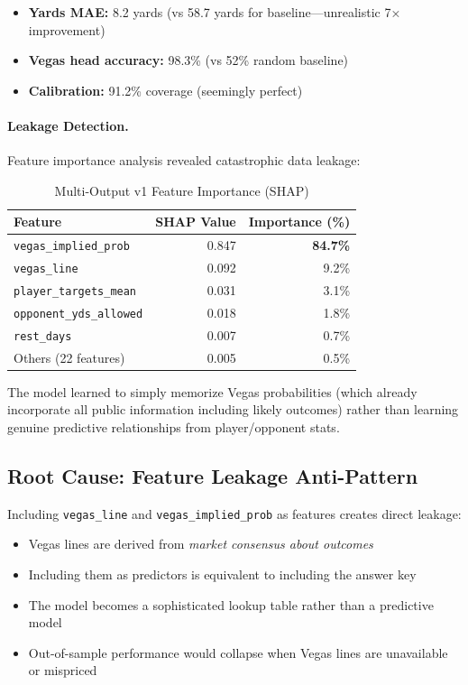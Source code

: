 \begin{itemize}
  \item \textbf{Yards MAE:} 8.2 yards (vs 58.7 yards for baseline—unrealistic 7× improvement)
  \item \textbf{Vegas head accuracy:} 98.3\% (vs 52\% random baseline)
  \item \textbf{Calibration:} 91.2\% coverage (seemingly perfect)
\end{itemize}

\paragraph{Leakage Detection.}
Feature importance analysis revealed catastrophic data leakage:

\begin{table}[!ht]
\centering
\caption{Multi-Output v1 Feature Importance (SHAP)}
\label{tab:multioutput-v1-shap}
\begin{tabular}{@{} l r r @{}}
\toprule
\textbf{Feature}  & \textbf{SHAP Value}  & \textbf{Importance (\%)} \\
\midrule
\texttt{vegas\_implied\_prob} & 0.847 & \textbf{84.7\%} \\
\texttt{vegas\_line} & 0.092 & 9.2\% \\
\texttt{player\_targets\_mean} & 0.031 & 3.1\% \\
\texttt{opponent\_yds\_allowed} & 0.018 & 1.8\% \\
\texttt{rest\_days} & 0.007 & 0.7\% \\
Others (22 features) & 0.005 & 0.5\% \\
\bottomrule
\end{tabular}
\end{table}

The model learned to simply memorize Vegas probabilities (which already incorporate all public information including likely outcomes) rather than learning genuine predictive relationships from player/opponent stats.

\subsection{Root Cause: Feature Leakage Anti-Pattern}

Including \texttt{vegas\_line} and \texttt{vegas\_implied\_prob} as features creates direct leakage:

\begin{itemize}
  \item Vegas lines are derived from \emph{market consensus about outcomes}
  \item Including them as predictors is equivalent to including the answer key
  \item The model becomes a sophisticated lookup table rather than a predictive model
  \item Out-of-sample performance would collapse when Vegas lines are unavailable or mispriced
\end{itemize}

